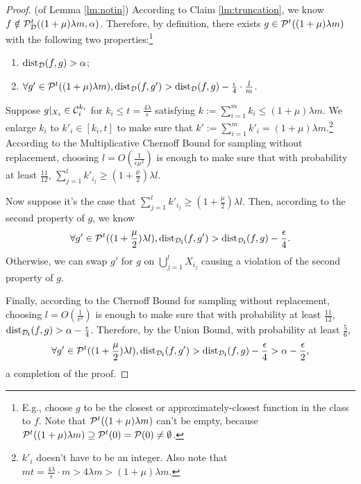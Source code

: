 \begin{proof}(of Lemma \ref{lm:notin})
According to Claim \ref{lm:truncation}, we know $f\notin{\mathcal{P}}^t_{{\mathcal{D}}}((1+\mu)\lambda m,\alpha)$. Therefore, by definition, there exists $g\in{\mathcal{P}}^t((1+\mu)\lambda m)$ with the following two properties:\footnote{E.g., choose $g$ to be the closest or approximately-closest function in the class to $f$.  Note that ${\mathcal{P}}^t((1+\mu)\lambda m)$ can't be empty, because ${\mathcal{P}}^t((1+\mu)\lambda m)\supseteq{\mathcal{P}}^t(0)={\mathcal{P}}(0)\neq\emptyset$.}
\begin{enumerate}
\item ${\mathrm{dist}}_{{\mathcal{D}}}(f,g)>\alpha$;
\item $\forall g'\in {\mathcal{P}}^t((1+\mu)\lambda m),{\mathrm{dist}}_{{\mathcal{D}}}(f,g')>{\mathrm{dist}}_{{\mathcal{D}}}(f,g)-\frac{\epsilon}{4}\cdot\frac{l}{m}$.
\end{enumerate}
Suppose $g|_{X_i}\in{\mathcal{C}}_{i}^{k_i}$ for $k_i\leq t=\frac{4\lambda}{\epsilon}$ satisfying $k:=\sum\limits_{i=1}^mk_i\leq(1+\mu)\lambda m$. We enlarge $k_i$ to $k'_i\in[k_i,t]$ to make sure that $k':=\sum\limits_{i=1}^mk'_i=(1+\mu)\lambda m$.\footnote{$k'_i$ doesn't have to be an integer. Also note that $mt=\frac{4\lambda}{\epsilon}\cdot m>4\lambda m>(1+\mu)\lambda m$.} According to the Multiplicative Chernoff Bound for sampling without replacement, choosing $l=O(\frac{1}{\epsilon\mu^2})$ is enough to make sure that with probability at least $\frac{11}{12}$, $\sum\limits_{j=1}^lk'_{i_j}\geq (1+\frac{\mu}{2})\lambda l$.

Now suppose it's the case that $\sum\limits_{j=1}^lk'_{i_j}\geq (1+\frac{\mu}{2})\lambda l$. Then, according to the second property of $g$, we know $$\forall g'\in{\mathcal{P}}^{t}((1+\frac{\mu}{2})\lambda l),{\mathrm{dist}}_{{\mathcal{D}}_{\mathbf i}}(f,g')> {\mathrm{dist}}_{{\mathcal{D}}_{\mathbf i}}(f,g)-\frac{\epsilon}{4}.$$ Otherwise, we can swap $g'$ for $g$ on $\bigcup\limits_{j=1}^lX_{i_j}$ causing a violation of the second property of $g$.

Finally, according to the Chernoff Bound for sampling without replacement, choosing $l=O(\frac{1}{\epsilon^2})$ is enough to make sure that with probability at least $\frac{11}{12}$, ${\mathrm{dist}}_{{\mathcal{D}}_{\mathbf i}}(f,g)>\alpha-\frac{\epsilon}{4}$. Therefore, by the Union Bound, with probability at least $\frac{5}{6}$, $$\forall g'\in{\mathcal{P}}^{t}((1+\frac{\mu}{2})\lambda l),{\mathrm{dist}}_{{\mathcal{D}}_{\mathbf i}}(f,g')> {\mathrm{dist}}_{{\mathcal{D}}_{\mathbf i}}(f,g)-\frac{\epsilon}{4}>\alpha-\frac{\epsilon}{2},$$ a completion of the proof.
\end{proof}

